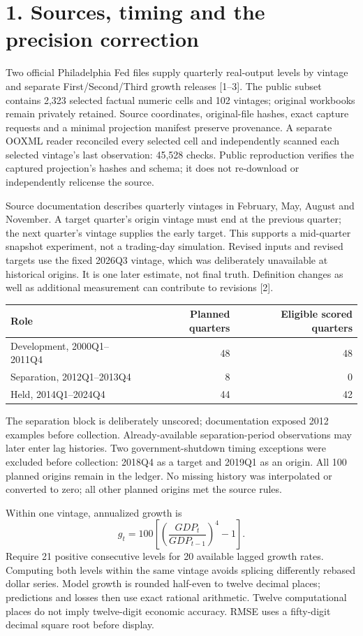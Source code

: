 \documentclass[10pt,letterpaper]{article}
\begin{document}
\section*{1. Sources, timing and the precision correction}
Two official Philadelphia Fed files supply quarterly real-output levels by vintage and separate First/Second/Third growth releases [1--3]. The public subset contains 2,323 selected factual numeric cells and 102 vintages; original workbooks remain privately retained. Source coordinates, original-file hashes, exact capture requests and a minimal projection manifest preserve provenance. A separate OOXML reader reconciled every selected cell and independently scanned each selected vintage's last observation: 45,528 checks. Public reproduction verifies the captured projection's hashes and schema; it does not re-download or independently relicense the source.

Source documentation describes quarterly vintages in February, May, August and November. A target quarter's origin vintage must end at the previous quarter; the next quarter's vintage supplies the early target. This supports a mid-quarter snapshot experiment, not a trading-day simulation. Revised inputs and revised targets use the fixed 2026Q3 vintage, which was deliberately unavailable at historical origins. It is one later estimate, not final truth. Definition changes as well as additional measurement can contribute to revisions [2].

\begin{center}\begin{tabular}{lrr}\toprule
Role & Planned quarters & Eligible scored quarters\\\midrule
Development, 2000Q1--2011Q4 & 48 & 48\\
Separation, 2012Q1--2013Q4 & 8 & 0\\
Held, 2014Q1--2024Q4 & 44 & 42\\\bottomrule
\end{tabular}\end{center}
The separation block is deliberately unscored; documentation exposed 2012 examples before collection. Already-available separation-period observations may later enter lag histories. Two government-shutdown timing exceptions were excluded before collection: 2018Q4 as a target and 2019Q1 as an origin. All 100 planned origins remain in the ledger. No missing history was interpolated or converted to zero; all other planned origins met the source rules.

Within one vintage, annualized growth is
\[g_t=100\left[\left(\frac{GDP_t}{GDP_{t-1}}\right)^4-1\right].\]
Require 21 positive consecutive levels for 20 available lagged growth rates. Computing both levels within the same vintage avoids splicing differently rebased dollar series. Model growth is rounded half-even to twelve decimal places; predictions and losses then use exact rational arithmetic. Twelve computational places do not imply twelve-digit economic accuracy. RMSE uses a fifty-digit decimal square root before display.
\end{document}
